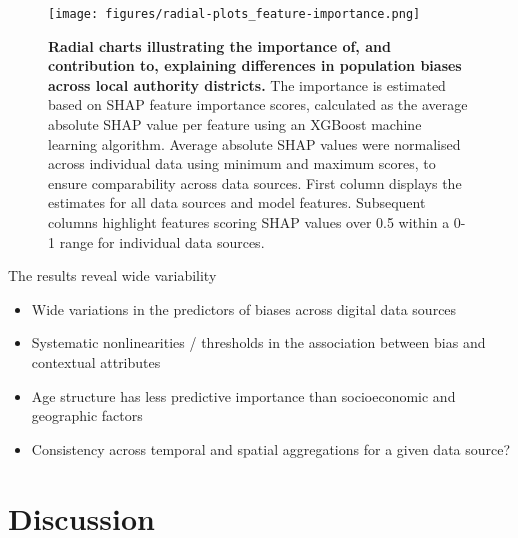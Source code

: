 \documentclass[]{rsos}%
\providecommand{\tightlist}{%
  \setlength{\itemsep}{0pt}\setlength{\parskip}{0pt}}
\begin{document}
\begin{figure}
\centering
\texttt{[image: figures/radial-plots\_feature-importance.png]}
\caption{\textbf{Radial charts illustrating the importance of, and contribution to, explaining differences in population biases across local authority districts.} The importance is estimated based on SHAP feature importance scores, calculated as the average absolute SHAP value per feature using an XGBoost machine learning algorithm. Average absolute SHAP values were normalised across individual data using minimum and maximum scores, to ensure comparability across data sources. First column displays the estimates for all data sources and model features. Subsequent columns highlight features scoring SHAP values over 0.5 within a 0-1 range for individual data sources.}\label{fig:radialplots}
\end{figure}

The results reveal wide variability

\begin{itemize}
\tightlist
\item
  Wide variations in the predictors of biases across digital data sources\\
\item
  Systematic nonlinearities / thresholds in the association between bias and contextual attributes\\
\item
  Age structure has less predictive importance than socioeconomic and geographic factors\\
\item
  Consistency across temporal and spatial aggregations for a given data source?
\end{itemize}

\section{Discussion}\label{discussion}










\end{document}
